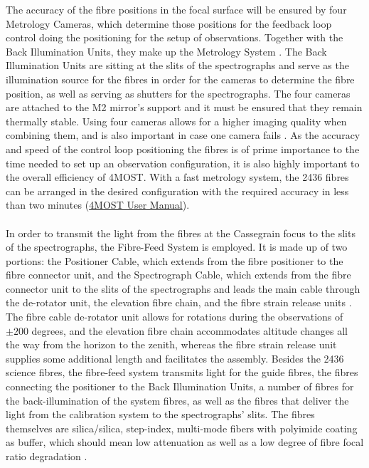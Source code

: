 \documentclass[a4paper,11pt]{article}
\begin{document}
The accuracy of the fibre positions in the focal surface will be ensured by four Metrology Cameras, which determine those positions for the feedback loop control doing the positioning for the setup of observations. Together with the Back Illumination Units, they make up the Metrology System \citep{winkler16,winkler18}. The Back Illumination Units are sitting at the slits of the spectrographs and serve as the illumination source for the fibres in order for the cameras to determine the fibre position, as well as serving as shutters for the spectrographs. The four cameras are attached to the M2 mirror's support and it must be ensured that they remain thermally stable. Using four cameras allows for a higher imaging quality when combining them, and is also important in case one camera fails \citep{4most16}. As the accuracy and speed of the control loop positioning the fibres is of prime importance to the time needed to set up an observation configuration, it is also highly important to the overall efficiency of 4MOST. With a fast metrology system, the 2436 fibres can be arranged in the desired configuration with the required accuracy in less than two minutes (\href{https://www.4most.eu/cms/files/VIS-MAN-4MOST-47110-9800-0001_2_00-4MOST-User-Manual.pdf}{4MOST User Manual}).\\ \\
%
In order to transmit the light from the fibres at the Cassegrain focus to the slits of the spectrographs, the Fibre-Feed System is employed. It is made up of two portions: the Positioner Cable, which extends from the fibre positioner to the fibre connector unit, and the Spectrograph Cable, which extends from the fibre connector unit to the slits of the spectrographs and leads the main cable through the de-rotator unit, the elevation fibre chain, and the fibre strain release units \citep{4most16}. The fibre cable de-rotator unit allows for rotations during the observations of $\pm200$ degrees, and the elevation fibre chain accommodates altitude changes all the way from the horizon to the zenith, whereas the fibre strain release unit supplies some additional length and facilitates the assembly. Besides the 2436 science fibres, the fibre-feed system transmits light for the guide fibres, the fibres connecting the positioner to the Back Illumination Units, a number of fibres for the back-illumination of the system fibres, as well as the fibres that deliver the light from the calibration system to the spectrographs' slits. The fibres themselves are silica/silica, step-index, multi-mode fibers with polyimide coating as buffer, which should mean low attenuation as well as a low degree of fibre focal ratio degradation \citep{haynes16}.\\ \\
\end{document}
